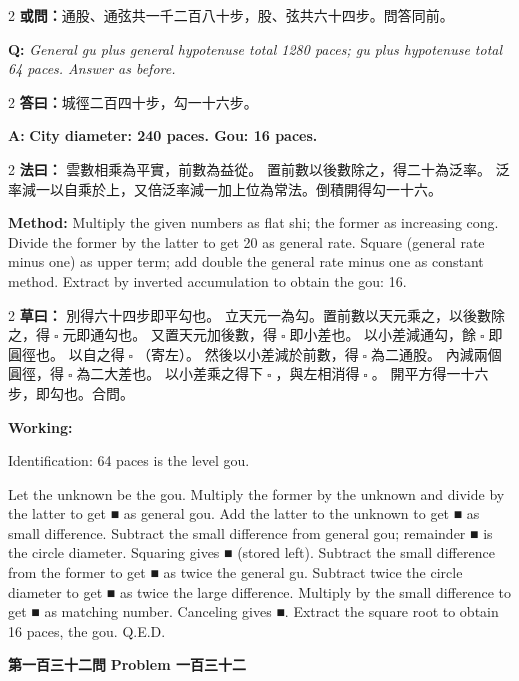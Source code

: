 \documentclass[11pt,a4paper]{article}
\let\origsquare\square
\renewcommand{\square}{\ensuremath{\origsquare}}%
\newcommand{\wen}[1]{%
  \par\vspace{0.5em}%
  \noindent\textcolor{problemcolor}{\textbf{第#1問}}%
  \hfill\textcolor{problemcolor}{\textbf{Problem #1}}\par\nopagebreak%
  \vspace{0.3em}%
}
\newcommand{\owen}[1]{%
  \noindent\textcolor{problemcolor}{\textbf{或問：}}{\tradfont #1}\par\nopagebreak%
}
\newcommand{\oweneng}[1]{%
  \noindent\textcolor{engcolor}{\textbf{Q: }}{\itshape #1}\par\nopagebreak%
}
\newcommand{\fayue}[1]{%
  \noindent\textcolor{methodcolor}{\textbf{法曰：}}{\tradfont #1}\par\nopagebreak%
}
\newcommand{\fayueeng}[1]{%
  \noindent\textcolor{engcolor}{\textbf{Method: }}{#1}\par\nopagebreak%
}
\newcommand{\tsaoyue}[1]{%
  \noindent\textcolor{workcolor}{\textbf{草曰：}}{\tradfont #1}\par%
}
\newcommand{\tsaoyueeng}[1]{%
  \noindent\textcolor{engcolor}{\textbf{Working: }}{\small #1}\par%
}
\newcommand{\dayue}[1]{%
  \noindent\textcolor{anscolor}{\textbf{答曰：}}{\tradfont #1}\par\nopagebreak%
}
\newcommand{\dayueeng}[1]{%
  \noindent\textcolor{engcolor}{\textbf{A: }}{\bfseries #1}\par\nopagebreak%
}
\begin{document}
\begin{paracol}{2}
\owen{通股、通弦共一千二百八十步，股、弦共六十四步。問答同前。}
\switchcolumn
\oweneng{General gu plus general hypotenuse total 1280 paces; gu plus hypotenuse total 64 paces. Answer as before.}
\end{paracol}

\begin{paracol}{2}
\dayue{城徑二百四十步，勾一十六步。}
\switchcolumn
\dayueeng{City diameter: 240 paces. Gou: 16 paces.}
\end{paracol}

\begin{paracol}{2}
\fayue{%
雲數相乘為平實，前數為益從。
置前數以後數除之，得二十為泛率。
泛率減一以自乘於上，又倍泛率減一加上位為常法。倒積開得勾一十六。}
\switchcolumn
\fayueeng{%
Multiply the given numbers as flat shi; the former as increasing cong. Divide the former by the latter to get 20 as general rate. Square (general rate minus one) as upper term; add double the general rate minus one as constant method. Extract by inverted accumulation to obtain the gou: 16.}
\end{paracol}

\begin{paracol}{2}
\tsaoyue{%
別得六十四步即平勾也。
立天元一為勾。置前數以天元乘之，以後數除之，得$ \; \square \; $元即通勾也。
又置天元加後數，得$ \; \square \; $即小差也。
以小差減通勾，餘$ \; \square \; $即圓徑也。
以自之得$ \; \square \; $（寄左）。
然後以小差減於前數，得$ \; \square \; $為二通股。
內減兩個圓徑，得$ \; \square \; $為二大差也。
以小差乘之得下$ \; \square \; $，與左相消得$ \; \square \; $。
開平方得一十六步，即勾也。合問。}
\switchcolumn
\tsaoyueeng{%
Identification: 64 paces is the level gou.

Let the unknown be the gou. Multiply the former by the unknown and divide by the latter to get ■ as general gou. Add the latter to the unknown to get ■ as small difference. Subtract the small difference from general gou; remainder ■ is the circle diameter. Squaring gives ■ (stored left). Subtract the small difference from the former to get ■ as twice the general gu. Subtract twice the circle diameter to get ■ as twice the large difference. Multiply by the small difference to get ■ as matching number. Canceling gives ■. Extract the square root to obtain 16 paces, the gou. Q.E.D.}
\end{paracol}

\vspace{0.5cm}

\wen{一百三十二}
\end{document}
